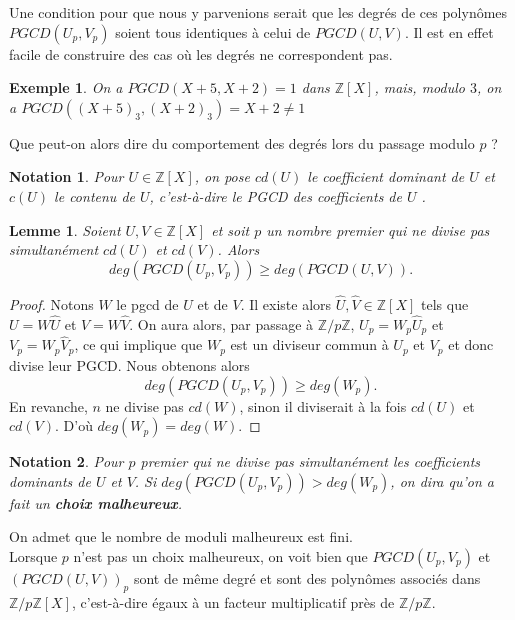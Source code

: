 \documentclass[12pt]{report}
\newtheorem*{ex}{Exemple}
\newtheorem{Lem}[thm]{Lemme}
\newtheorem*{nota}{Notation}
\begin{document}
Une condition pour que nous y parvenions serait que les degrés de ces polynômes $PGCD(U_p,V_p)$ soient tous identiques à celui de $PGCD(U,V)$. Il est en effet facile de construire des cas où les degrés ne correspondent pas.

\begin{ex}
On a $PGCD(X+5,X+2)=1$ dans $\mathbb{Z}[X]$, mais, modulo $3$, on a $PGCD((X+5)_3,(X+2)_3)=X+2\neq 1$
\end{ex}


Que peut-on alors dire du comportement des degrés lors du passage modulo $p$ ?


\begin{nota}
Pour $U \in \mathbb{Z}[X]$, on pose $cd(U)$ le coefficient dominant de $U$ et $c(U)$ le contenu de $U$, c'est-à-dire le PGCD des coefficients de $U$ .
\end{nota}

\begin{Lem}
Soient $U,V \in \mathbb{Z}[X]$ et soit $p$ un nombre premier qui ne divise pas simultanément $cd(U)$ et $cd(V)$. Alors
$$ deg (PGCD(U_p,V_p))\geq deg( PGCD(U,V) ).      $$ 
\end{Lem}

\begin{proof}
Notons $W$ le pgcd de $U$ et de $V$. Il existe alors $\widehat{U},\widehat{V} \in \mathbb{Z}[X]$ tels que $U=W\widehat{U} $ et $V=W\widehat{V}$. On aura alors, par passage à $\mathbb{Z}/p\mathbb{Z}$, $U_p=W_p\widehat{U}_p $ et $V_p=W_p\widehat{V}_p$, ce qui implique que $W_p$ est un diviseur commun à $U_p$ et $V_p$ et donc divise leur PGCD. Nous obtenons alors
$$ deg (PGCD(U_p,V_p) ) \geq deg (W_p).       $$
En revanche, $n$ ne divise pas $cd(W)$, sinon il diviserait à la fois $cd(U)$ et $cd(V)$. D'où $deg(W_p)=deg(W)$.
\end{proof}



\begin{nota}
Pour $p$ premier qui ne divise pas simultanément les coefficients dominants de $U$ et $V$. Si $deg (PGCD(U_p,V_p) ) > deg (W_p)$, on dira qu'on a fait un \textbf{choix malheureux}. 
\end{nota}
On admet que le nombre de moduli malheureux est fini. \\

Lorsque $p$ n'est pas un choix malheureux, on voit bien que $PGCD(U_p,V_p)$ et $(PGCD(U,V))_p$ sont de même degré et sont des polynômes associés dans $\mathbb{Z}/p\mathbb{Z}[X]$, c'est-à-dire égaux à un facteur multiplicatif près de $\mathbb{Z}/p\mathbb{Z}$. \\
\end{document}
